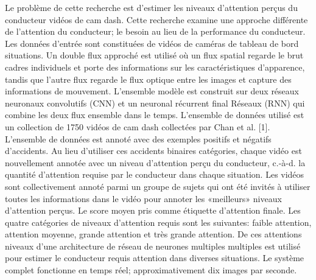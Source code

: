 Le problème de cette recherche est d'estimer les niveaux d'attention perçus du conducteur vidéos de cam dash. Cette recherche examine une approche différente de l'attention du conducteur; le besoin au lieu de la performance du conducteur. Les données d'entrée sont constituées de vidéos de caméras de tableau de bord situations. Un double flux approché est utilisé où un flux spatial regarde le brut cadres individuels et porte des informations sur les caractéristiques d'apparence, tandis que l'autre flux regarde le flux optique entre les images et capture des informations de mouvement. L'ensemble modèle est construit sur deux réseaux neuronaux convolutifs (CNN) et un neuronal récurrent final Réseaux (RNN) qui combine les deux flux ensemble dans le temps. L'ensemble de données utilisé est un collection de 1750 vidéos de cam dash collectées par Chan et al. [1]. L'ensemble de données est annoté avec des exemples positifs et négatifs d'accidents. Au lieu d'utiliser ces accidents binaires catégories, chaque vidéo est nouvellement annotée avec un niveau d'attention perçu du conducteur, c.-à-d. la quantité d'attention requise par le conducteur dans chaque situation. Les vidéos sont collectivement annoté parmi un groupe de sujets qui ont été invités à utiliser toutes les informations dans le vidéo pour annoter les «meilleurs» niveaux d'attention perçus. Le score moyen pris comme étiquette d'attention finale. Les quatre catégories de niveaux d'attention requis sont les suivantes: faible attention, attention moyenne, grande attention et très grande attention. De ces attentions niveaux d'une architecture de réseau de neurones multiples multiples est utilisé pour estimer le conducteur requis attention dans diverses situations. Le système complet fonctionne en temps réel; approximativement dix images par seconde.
